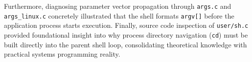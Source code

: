 \documentclass[12pt,a4paper]{report}
\numberwithin{equation}{chapter}
\numberwithin{figure}{chapter}
\numberwithin{table}{chapter}
\begin{document}
Furthermore, diagnosing parameter vector propagation through \texttt{args.c} and \texttt{args\_linux.c} concretely illustrated that the shell formats \texttt{argv[]} before the application process starts execution. Finally, source code inspection of \texttt{user/sh.c} provided foundational insight into why process directory navigation (\texttt{cd}) must be built directly into the parent shell loop, consolidating theoretical knowledge with practical systems programming reality.
\end{document}
